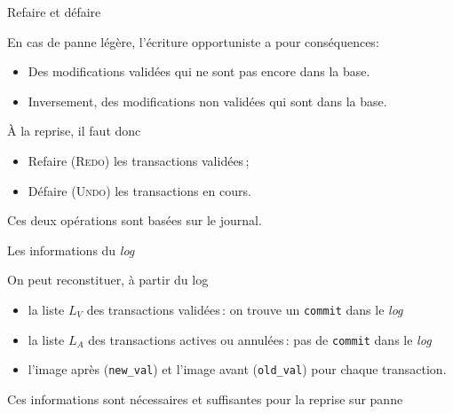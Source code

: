 \begin{frame}{Refaire et défaire}

En cas de  panne \alert{légère}, 
\alert{l'écriture opportuniste} a pour conséquences:

\begin{itemize}
  \item Des modifications \alert{validées} qui ne sont
   pas encore dans la base.
     
  \item  Inversement, des modifications \alert{non validées} qui sont
    dans la base.
\end{itemize}

\vfill

À la reprise, il faut donc

\begin{itemize}
  \item \alert{Refaire} (\textsc{Redo}) les transactions validées\,;
     
  \item   \alert{Défaire} (\textsc{Undo}) les
        transactions en cours.

\end{itemize}

\vfill

Ces deux opérations sont basées sur le journal.

\end{frame}


\begin{frame}{Les informations du \textit{log}}

On peut reconstituer, à partir du log

\vfill

\begin{itemize}
  \item la liste $L_V$ des transactions validées\,: on trouve un
      \texttt{commit} dans le \textit{log}
  \item la liste $L_A$ des transactions actives ou annulées\,:
      pas de \texttt{commit} dans le \textit{log}
   \item l'image après (\texttt{new\_val}) et l'image avant (\texttt{old\_val})
      pour chaque transaction.
\end{itemize}

\vfill
\begin{block}{}
Ces informations sont nécessaires et suffisantes pour la reprise sur panne
\end{block}
\end{frame}

